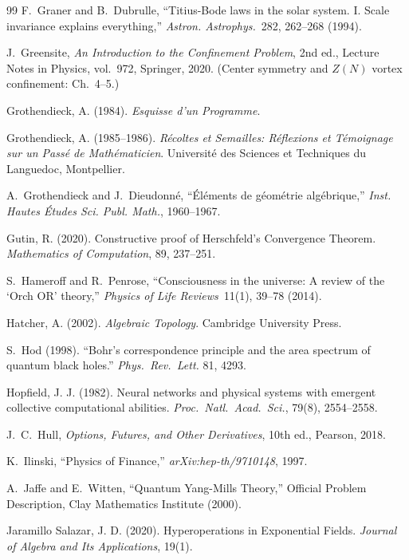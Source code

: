 \begin{thebibliography}{99}
 F.~Graner and B.~Dubrulle, ``Titius-Bode laws in the solar system. I. Scale invariance explains everything,'' \emph{Astron. Astrophys.}\ 282, 262--268 (1994).

J.~Greensite, \emph{An Introduction to the Confinement Problem}, 2nd ed., Lecture Notes in Physics, vol.~972, Springer, 2020. (Center symmetry and $Z(N)$ vortex confinement: Ch.~4--5.)

 Grothendieck, A. (1984). \emph{Esquisse d'un Programme}.

 Grothendieck, A. (1985--1986). \emph{R\'ecoltes et Semailles: R\'eflexions et T\'emoignage sur un Pass\'e de Math\'ematicien}. Universit\'e des Sciences et Techniques du Languedoc, Montpellier.

A.~Grothendieck and J.~Dieudonn\'e,
``\'El\'ements de g\'eom\'etrie alg\'ebrique,''
\emph{Inst. Hautes \'Etudes Sci. Publ. Math.}, 1960--1967.

 Gutin, R. (2020). Constructive proof of Herschfeld's Convergence Theorem. \emph{Mathematics of Computation}, 89, 237--251.

 S.~Hameroff and R.~Penrose, ``Consciousness in the universe: A review of the `Orch OR' theory,'' \emph{Physics of Life Reviews}\ 11(1), 39--78 (2014).

 Hatcher, A. (2002). \emph{Algebraic Topology}. Cambridge University Press.

S.~Hod (1998).
``Bohr's correspondence principle and the area spectrum of quantum black holes.''
\textit{Phys.\ Rev.\ Lett.} 81, 4293.

 Hopfield, J. J. (1982). Neural networks and physical systems with emergent collective computational abilities. \emph{Proc.\ Natl.\ Acad.\ Sci.}, 79(8), 2554--2558.

J.~C.~Hull,
\emph{Options, Futures, and Other Derivatives},
10th ed., Pearson, 2018.

K.~Ilinski,
``Physics of Finance,''
\emph{arXiv:hep-th/9710148}, 1997.

A.~Jaffe and E.~Witten,
``Quantum Yang-Mills Theory,''
Official Problem Description, Clay Mathematics Institute (2000).

 Jaramillo Salazar, J. D. (2020). Hyperoperations in Exponential Fields. \emph{Journal of Algebra and Its Applications}, 19(1).


\end{thebibliography}
